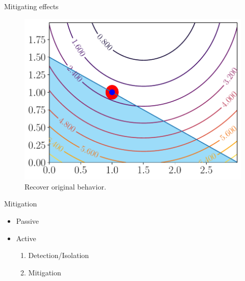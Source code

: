 \documentclass[aspectratio=169]{beamer}
\begin{document}
\begin{frame}{Mitigating effects}
\begin{overlayarea}{\textwidth}{.4\textwidth}
{\begin{minipage}[t]{.45\linewidth}
{\begin{figure}[h]
            \includegraphics[width=\textwidth]{../img/resilient_eq/correctX.pdf}
            \caption*{\alert<5>{Recover original behavior}.}\label{fig:minimum_recovered}
          \end{figure}
        }
      \end{minipage}
    }
  \end{overlayarea}
\end{frame}

\begin{frame}{Mitigation}
  \begin{itemize}
    \item<2-> Passive 
    \item<3-> Active 
          \begin{enumerate}
            \item<6-> Detection/Isolation
            \item<7-> Mitigation
          \end{enumerate}
  \end{itemize}
\end{frame}
\end{document}
